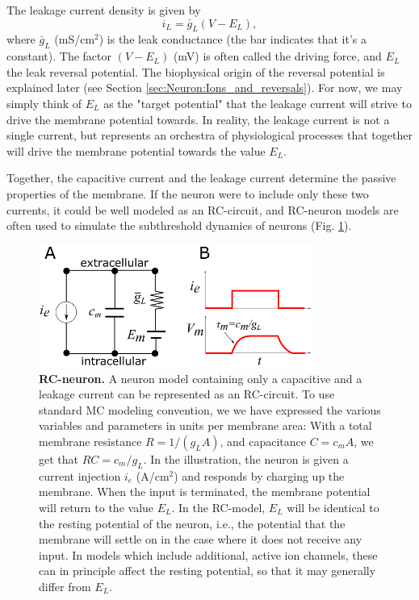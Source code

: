 The leakage current density is given by
\begin{equation}
i_L = \bar{g}_L (V - E_L),
\label{Neuron:eq:HHleak}
\end{equation}
where $\bar{g}_L$ (mS/cm$^2$) is the leak conductance (the bar indicates that it's a constant). The factor $(V - E_L)$ (mV) is often called the driving force, and $E_L$ the leak reversal potential. The biophysical origin of the reversal potential is explained later (see Section \ref{sec:Neuron:Ions_and_reversals}). For now, we may simply think of $E_L$ as the "target potential" that the leakage current will strive to drive the membrane potential towards. In reality, the leakage current is not a single current, but represents an orchestra of physiological processes that together will drive the membrane potential towards the value $E_L$. 

Together, the capacitive current and the leakage current determine the passive properties of the membrane. If the neuron were to include only these two currents, it could be well modeled as an RC-circuit, and RC-neuron models are often used to simulate the subthreshold dynamics of neurons (Fig. \ref{Neuron:fig:RC}). 

\begin{figure}[!ht]
\begin{center}
\includegraphics[width=0.8\textwidth]{Figures/Neuron/RCneuron.png}
\end{center}
\caption{\textbf{RC-neuron.}  A neuron model containing only a capacitive and a leakage current can be represented as an RC-circuit. To use standard MC modeling convention, we we have expressed the various variables and parameters in units per membrane area: With a total membrane resistance $R = 1/(g_L A)$, and capacitance $C = c_mA$, we get that $RC = c_m/g_L$. In the illustration, the neuron is given a current injection $i_e$ (A/cm$^2$) and responds by charging up the membrane. When the input is terminated, the membrane potential will return to the value $E_L$. In the RC-model, $E_L$ will be identical to the resting potential of the neuron, i.e., the potential that the membrane will settle on in the case where it does not receive any input. In models which include additional, active ion channels, these can in principle affect the resting potential, so that it may generally differ from $E_L$.
}
\label{Neuron:fig:RC}
\end{figure}


